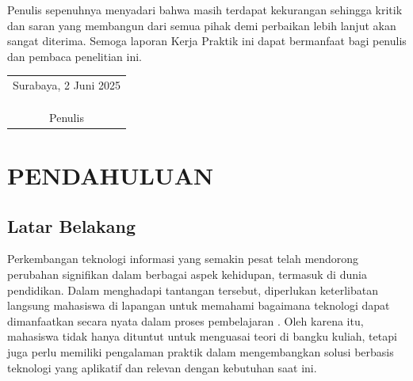 \documentclass{file/KP-ITS}
\theoremstyle{definition}
\theoremstyle{definition}
\theoremstyle{plain}
\begin{document}
\indent Penulis sepenuhnya menyadari bahwa masih terdapat kekurangan sehingga kritik dan saran yang membangun dari semua pihak demi perbaikan lebih lanjut akan sangat diterima. Semoga laporan Kerja Praktik ini dapat bermanfaat bagi penulis dan pembaca penelitian ini. 

\begin{flushright}
  \begin{tabular}[b]{c}
    Surabaya, 2 Juni 2025
    \\
    \\
    \\
    \\
    Penulis
  \end{tabular}
\end{flushright}


\DaftarIsi

\DaftarGambar






\BagianInti

\chapter{PENDAHULUAN}
\section{Latar Belakang}
Perkembangan teknologi informasi yang semakin pesat telah mendorong perubahan signifikan dalam berbagai aspek kehidupan, termasuk di dunia pendidikan. Dalam menghadapi tantangan tersebut, diperlukan keterlibatan langsung mahasiswa di lapangan untuk memahami bagaimana teknologi dapat dimanfaatkan secara nyata dalam proses pembelajaran \cite{suryadi2019}. Oleh karena itu, mahasiswa tidak hanya dituntut untuk menguasai teori di bangku kuliah, tetapi juga perlu memiliki pengalaman praktik dalam mengembangkan solusi berbasis teknologi yang aplikatif dan relevan dengan kebutuhan saat ini.
\end{document}
